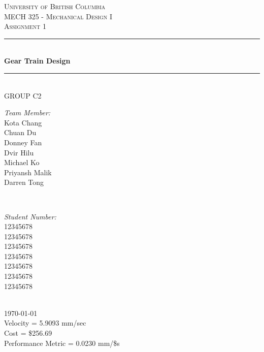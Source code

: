 \documentclass[letterpaper,12pt]{article}
\begin{document}
	
\begin{titlepage}
	
	\newcommand{\HRule}{\rule{\linewidth}{0.5mm}}
	
	\center
	
	\textsc{\LARGE University of British Columbia}\\[1.5cm]
	\textsc{\Large MECH 325 - Mechanical Design I}\\[0.5cm]
	\textsc{\Large Assignment 1}\\[0.5cm]
	
	\HRule \\[0.8cm]
	{ \huge \bfseries Gear Train Design}\\[0.4cm]
	\HRule \\[1cm]
	
	{\Large GROUP C2}\\
	\vspace{0.5cm}
	
	\begin{minipage}{0.4\textwidth}
		\begin{flushleft} \large
			\emph{Team Member:}\\
			Kota Chang\\
			Chuan Du\\
			Donney Fan\\
			Dvir Hilu\\
			Michael Ko\\
			Priyansh Malik\\
			Darren Tong\\
		\end{flushleft}
	\end{minipage}
	~
	\begin{minipage}{0.4\textwidth}
		\begin{flushright} \large
			\emph{Student Number:} \\
			12345678\\
			12345678\\
			12345678\\
			12345678\\
			12345678\\
			12345678\\
			12345678
			
		\end{flushright}
	\end{minipage}\\[2cm]
	
	{\large \today}\\[2cm]
	
	{\large
		Velocity = 5.9093 mm/sec\\
		Cost = \$256.69\\
		Performance Metric = 0.0230 mm/\$s
	}
	
	
	\vfill %
	
\end{titlepage}
\end{document}
